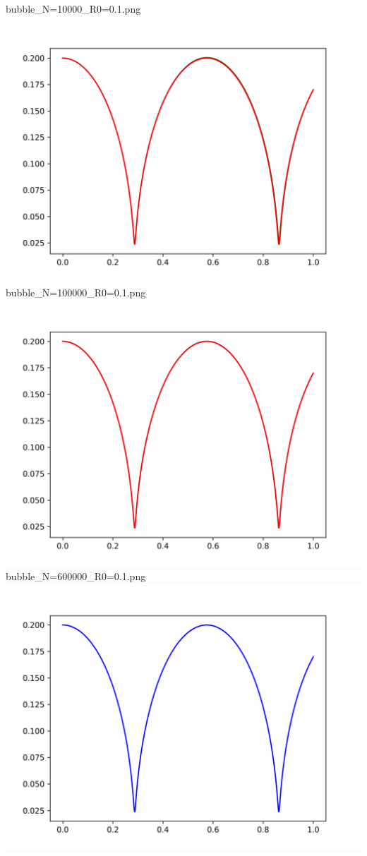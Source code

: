 \documentclass[a4paper,14pt]{article}
\begin{document}
bubble\_N=10000\_R0=0.1.png\newline
\includegraphics[scale=0.5]{images/graphs/bubble_N=100000_R0=0.2.png}\newline
bubble\_N=100000\_R0=0.1.png\newline
\includegraphics[scale=0.5]{images/graphs/bubble_N=600000_R0=0.2.png}\newline
bubble\_N=600000\_R0=0.1.png\newline
%
\includegraphics[scale=0.5]{images/graphs/bubble_N=1000_R0=0.2.png}\newline
\end{document}
